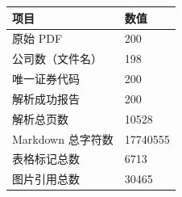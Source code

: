 \begin{tabular}{ll}
\toprule
项目 & 数值 \\
\midrule
原始 PDF & 200 \\
公司数（文件名） & 198 \\
唯一证券代码 & 200 \\
解析成功报告 & 200 \\
解析总页数 & 10528 \\
Markdown 总字符数 & 17740555 \\
表格标记总数 & 6713 \\
图片引用总数 & 30465 \\
\bottomrule
\end{tabular}
